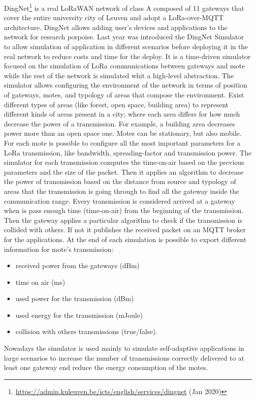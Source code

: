DingNet\footnote{\href{https://admin.kuleuven.be/icts/english/services/dingnet}{https://admin.kuleuven.be/icts/english/services/dingnet} (Jan 2020)} is a real LoRaWAN network of class A composed of 11 gateways that cover the entire university city of Leuven and adopt a LoRa-over-MQTT architecture. 
% 
DingNet allows adding user's devices and applications to the network for research porpoise.
% 
Last year was introduced the DingNet Simulator~\cite{inproceedings} to allow simulation of application in different scenarios before deploying it in the real network to reduce costs and time for the deploy.
% 
It is a time-driven simulator focused on the simulation of LoRa communications between gateways and mote while the rest of the network is simulated whit a high-level abstraction. 
% 
The simulator allows configuring the environment of the network in terms of position of gateways, motes, and typology of areas that compose the environment. 
% 
Exist different types of areas (like forest, open space, building area) to represent different kinds of areas present in a city; where each area differs for how much decrease the power of a transmission. For example, a building area decreases power more than an open space one.
% 
Motes can be stationary, but also mobile.
% 
For each mote is possible to configure all the most important parameters for a LoRa transmission, like bandwidth, spreading-factor and transmission power. 
% 
The simulator for each transmission computes the time-on-air based on the previous parameters and the size of the packet. 
% 
Then it applies an algorithm to decrease the power of transmission based on the distance from source and typology of areas that the transmission is going through to find all the gateway inside the communication range.
% 
Every transmission is considered arrived at a gateway when is pass enough time (time-on-air) from the beginning of the transmission. 
Then the gateway applies a particular algorithm to check if the transmission is collided with others. If not it publishes the received packet on an MQTT broker for the applications.
%
At the end of each simulation is possible to export different information for mote's transmission:
\begin{itemize}
    \item received power from the gateways (dBm)
    \item time on air (ms)
    \item used power for the transmission (dBm)
    \item used energy for the transmission (mJoule)
    \item collision with others transmissions (true/false).
\end{itemize}

Nowadays the simulator is used mainly to simulate self-adaptive applications in large scenarios to increase the number of transmissions correctly delivered to at least one gateway end reduce the energy consumption of the motes.
